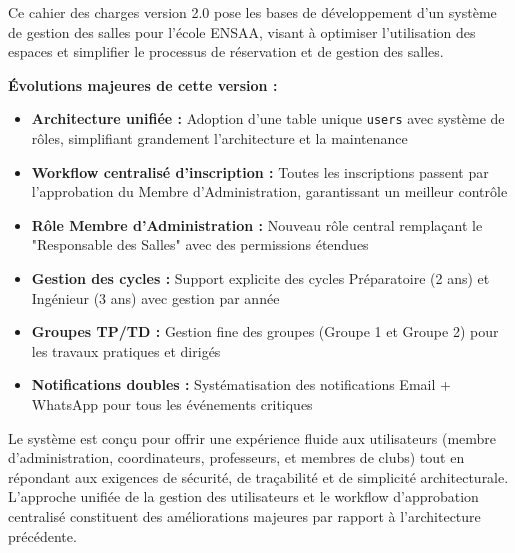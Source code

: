 \documentclass[12pt,a4paper]{article}
\begin{document}
Ce cahier des charges version 2.0 pose les bases de développement d'un système de gestion des salles pour l'école ENSAA, visant à optimiser l'utilisation des espaces et simplifier le processus de réservation et de gestion des salles.

\textbf{Évolutions majeures de cette version :}
\begin{itemize}
    \item \textbf{Architecture unifiée :} Adoption d'une table unique \texttt{users} avec système de rôles, simplifiant grandement l'architecture et la maintenance
    \item \textbf{Workflow centralisé d'inscription :} Toutes les inscriptions passent par l'approbation du Membre d'Administration, garantissant un meilleur contrôle
    \item \textbf{Rôle Membre d'Administration :} Nouveau rôle central remplaçant le "Responsable des Salles" avec des permissions étendues
    \item \textbf{Gestion des cycles :} Support explicite des cycles Préparatoire (2 ans) et Ingénieur (3 ans) avec gestion par année
    \item \textbf{Groupes TP/TD :} Gestion fine des groupes (Groupe 1 et Groupe 2) pour les travaux pratiques et dirigés
    \item \textbf{Notifications doubles :} Systématisation des notifications Email + WhatsApp pour tous les événements critiques
\end{itemize}

Le système est conçu pour offrir une expérience fluide aux utilisateurs (membre d'administration, coordinateurs, professeurs, et membres de clubs) tout en répondant aux exigences de sécurité, de traçabilité et de simplicité architecturale. L'approche unifiée de la gestion des utilisateurs et le workflow d'approbation centralisé constituent des améliorations majeures par rapport à l'architecture précédente.
\end{document}
